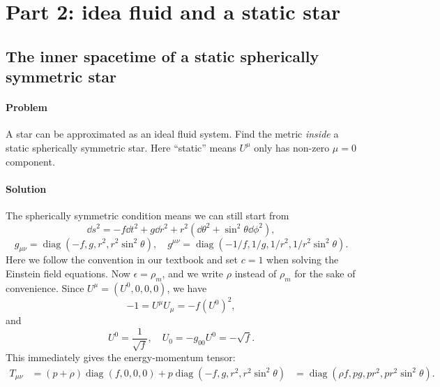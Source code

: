 \documentclass[hyperref, a4paper]{article}
\DeclareMathOperator{\diag}{diag}
\def\\{}%
\begin{document}
\section{Part 2: idea fluid and a static star}

\subsection{The inner spacetime of a static spherically symmetric star}

\paragraph{Problem} A star can be approximated as an ideal fluid system. Find the metric \emph{inside} a static
spherically symmetric star. Here ``static'' means $U^\mu$ only has non-zero $\mu = 0$ component.

\paragraph{Solution} The spherically symmetric condition means we can still start from
\begin{equation}
    \dd{s^2} = - f \dd{t^2} + g \dd{r^2} + r^2 (\dd{\theta^2} + \sin^2 \theta \dd{\phi^2}),
\end{equation}
\begin{equation}
    g_{\mu \nu} = \diag(-f, g, r^2, r^2 \sin^2 \theta), \quad g^{\mu \nu} = \diag(- 1 / f, 1 / g, 1 / r^2, 1 / r^2 \sin^2 \theta).
\end{equation}
Here we follow the convention in our textbook \cite{bambi2018introduction} and set $c = 1$ when solving 
the Einstein field equations. Now $\epsilon = \rho_m$, and we write $\rho$ instead of $\rho_m$ for the sake 
of convenience. Since $U^\mu = (U^0, 0, 0, 0)$, we have 
\[
    -1 = U^\mu U_\mu = - f (U^0)^2,
\]
and 
\begin{equation}
    U^0 = \frac{1}{\sqrt{f}}, \quad U_0 = - g_{00} U^0 = - \sqrt{f}.
\end{equation}
This immediately gives the energy-momentum tensor: 
\begin{equation}
    \begin{aligned}
        T_{\mu \nu} &= (p + \rho) \diag(f, 0, 0, 0) + p \diag(- f, g, r^2, r^2 \sin^2 \theta) \\
        &= \diag (\rho f, pg, p r^2, p r^2 \sin^2 \theta).
    \end{aligned}
\end{equation}
\end{document}
